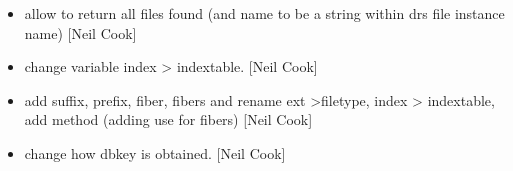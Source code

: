 \documentclass[a4paper,10pt,english]{report}
\begin{document}
\begin{itemize}
\item {} 
 \sphinxhyphen{} allow  to return all files found
(and name to be a string within drs file instance name) {[}Neil Cook{]}

\item {} 
 \sphinxhyphen{} change variable index \textendash{}\textgreater{} indextable. {[}Neil Cook{]}

\item {} 
 \sphinxhyphen{} add suffix, prefix, fiber, fibers and rename ext
\textendash{}\textgreater{}filetype, index \textendash{}\textgreater{} indextable, add method  (adding use
for fibers) {[}Neil Cook{]}

\item {} 
 \sphinxhyphen{} change how dbkey is obtained. {[}Neil Cook{]}

\end{itemize}
\end{document}
